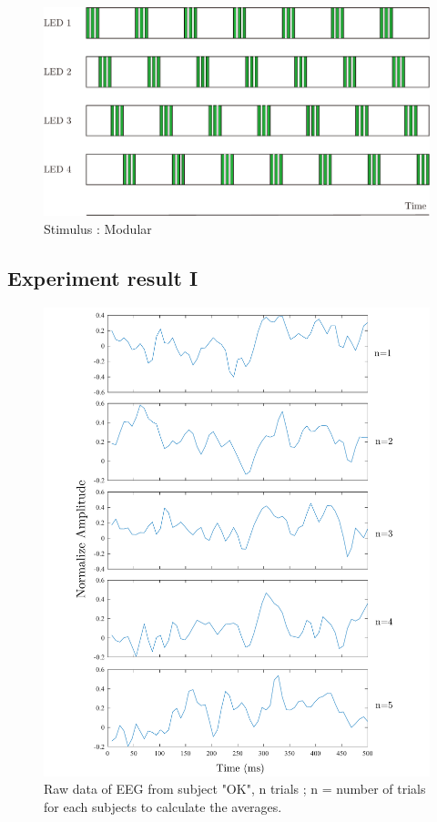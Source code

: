 \begin{figure}[ht]
	\centering
	\includegraphics[scale = 0.65]{chapter7/mod_nor.pdf}
	\caption{Stimulus : Modular}
\end{figure}

\newpage
\subsection{Experiment result I}

\begin{figure}[ht]
	\centering
	\includegraphics[scale = 0.4]{chapter7/rawdata.pdf}
	\caption{Raw data of EEG from subject "OK", n trials ; n = number of trials for each subjects to calculate the averages.}
		\label{fig:raw_data}
\end{figure}

